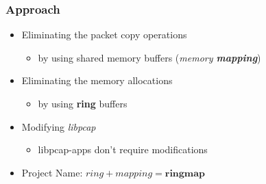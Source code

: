 \begin{frame}
\frametitle{Approach}
\begin{itemize}
	\item<1-> Eliminating the packet copy operations
		\begin{itemize}
			\item<1-> by using shared memory buffers (\emph{memory \textbf{mapping}})
		\end{itemize}
	\item<2-> Eliminating the memory allocations
		\begin{itemize}
			\item<2-> by using \textbf{ring} buffers
		\end{itemize}
	\item<3-> Modifying \emph{libpcap}
		\begin{itemize}
			\item<3-> libpcap-apps don't require modifications\newline
		\end{itemize}
	\item<4->[$\Rightarrow$] Project Name: $ring + mapping = \textbf{ringmap}$
\end{itemize}
\end{frame}


